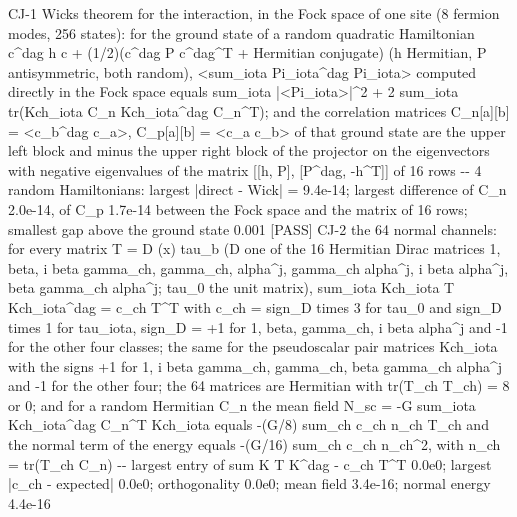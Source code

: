\documentclass[
  10pt,
]{article}
\newenvironment{Shaded}{}{}
\newcommand{\NormalTok}[1]{#1}
\begin{document}
\begin{Shaded}
\begin{Highlighting}[]
\NormalTok{[PASS] CJ{-}1  Wick\textquotesingle{}s theorem for the interaction, in the Fock space of one site (8 fermion modes, 256 states): for the ground state of a random quadratic Hamiltonian c\^{}dag h c + (1/2)(c\^{}dag P c\^{}dag\^{}T + Hermitian conjugate) (h Hermitian, P antisymmetric, both random), \textless{}sum\_iota Pi\_iota\^{}dag Pi\_iota\textgreater{} computed directly in the Fock space equals sum\_iota |\textless{}Pi\_iota\textgreater{}|\^{}2 + 2 sum\_iota tr(Kch\_iota C\_n Kch\_iota\^{}dag C\_n\^{}T); and the correlation matrices C\_n[a][b] = \textless{}c\_b\^{}dag c\_a\textgreater{}, C\_p[a][b] = \textless{}c\_a c\_b\textgreater{} of that ground state are the upper left block and minus the upper right block of the projector on the eigenvectors with negative eigenvalues of the matrix [[h, P], [P\^{}dag, {-}h\^{}T]] of 16 rows  {-}{-} 4 random Hamiltonians: largest |direct {-} Wick| = 9.4e{-}14; largest difference of C\_n 2.0e{-}14, of C\_p 1.7e{-}14 between the Fock space and the matrix of 16 rows; smallest gap above the ground state 0.001}
\NormalTok{[PASS] CJ{-}2  the 64 normal channels: for every matrix T = D (x) tau\_b (D one of the 16 Hermitian Dirac matrices 1, beta, i beta gamma\_ch, gamma\_ch, alpha\^{}j, gamma\_ch alpha\^{}j, i beta alpha\^{}j, beta gamma\_ch alpha\^{}j; tau\_0 the unit matrix), sum\_iota Kch\_iota T Kch\_iota\^{}dag = c\_ch T\^{}T with c\_ch = sign\_D times 3 for tau\_0 and sign\_D times 1 for tau\_iota, sign\_D = +1 for 1, beta, gamma\_ch, i beta alpha\^{}j and {-}1 for the other four classes; the same for the pseudoscalar pair matrices Kch\textquotesingle{}\_iota with the signs +1 for 1, i beta gamma\_ch, gamma\_ch, beta gamma\_ch alpha\^{}j and {-}1 for the other four; the 64 matrices are Hermitian with tr(T\_ch T\_ch\textquotesingle{}) = 8 or 0; and for a random Hermitian C\_n the mean field N\_sc = {-}G sum\_iota Kch\_iota\^{}dag C\_n\^{}T Kch\_iota equals {-}(G/8) sum\_ch c\_ch n\_ch T\_ch and the normal term of the energy equals {-}(G/16) sum\_ch c\_ch n\_ch\^{}2, with n\_ch = tr(T\_ch C\_n)  {-}{-} largest entry of sum K T K\^{}dag {-} c\_ch T\^{}T 0.0e0; largest |c\_ch {-} expected| 0.0e0; orthogonality 0.0e0; mean field 3.4e{-}16; normal energy 4.4e{-}16}

\end{Highlighting}
\end{Shaded}
\end{document}
